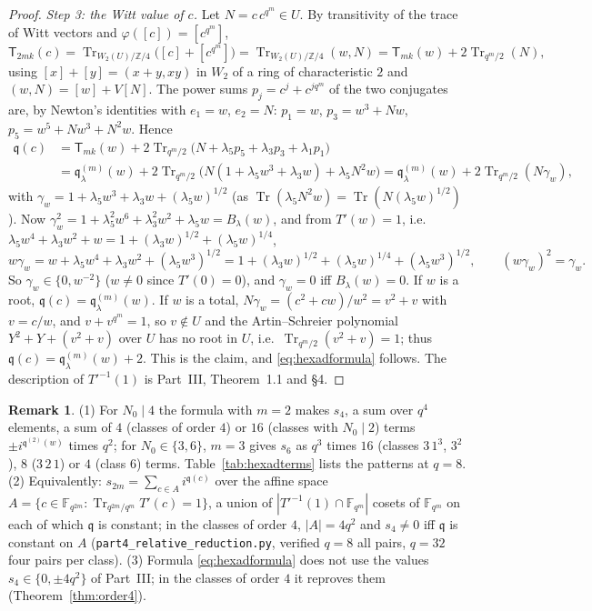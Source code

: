 \documentclass[12pt,a4paper]{amsart}
\theoremstyle{definition}
\newtheorem{remark}[theorem]{Remark}
\newcommand{\F}{\mathbb{F}}
\newcommand{\Z}{\mathbb{Z}}
\newcommand{\Tr}{\operatorname{Tr}}
\newcommand{\qq}{\mathfrak{q}}
\newcommand{\Tw}{\mathsf{T}}
\begin{document}
\begin{proof}
\emph{Step 3: the Witt value of $c$.} Let $N=c\,c^{q^m}\in U$. By transitivity of the trace of Witt vectors and $\varphi([c])=[c^{q^m}]$,
\[
\Tw_{2mk}(c)=\Tr_{W_2(U)/\Z/4}\bigl([c]+[c^{q^m}]\bigr)=\Tr_{W_2(U)/\Z/4}(w,N)=\Tw_{mk}(w)+2\Tr_{q^m/2}(N),
\]
using $[x]+[y]=(x+y,xy)$ in $W_2$ of a ring of characteristic $2$ and $(w,N)=[w]+V[N]$. The power sums $p_j=c^j+c^{jq^m}$ of the two conjugates are, by Newton's identities with $e_1=w$, $e_2=N$: $p_1=w$, $p_3=w^3+Nw$, $p_5=w^5+Nw^3+N^2w$. Hence
\begin{align*}
\qq(c)&=\Tw_{mk}(w)+2\Tr_{q^m/2}\bigl(N+\lambda_5p_5+\lambda_3p_3+\lambda_1p_1\bigr)\\
&=\qq^{(m)}_\lambda(w)+2\Tr_{q^m/2}\bigl(N(1+\lambda_5w^3+\lambda_3w)+\lambda_5N^2w\bigr)=\qq^{(m)}_\lambda(w)+2\Tr_{q^m/2}(N\gamma_w),
\end{align*}
with $\gamma_w=1+\lambda_5w^3+\lambda_3w+(\lambda_5w)^{1/2}$ (as $\Tr(\lambda_5N^2w)=\Tr(N(\lambda_5w)^{1/2})$). Now $\gamma_w^2=1+\lambda_5^2w^6+\lambda_3^2w^2+\lambda_5w=B_\lambda(w)$, and from $T'(w)=1$, i.e.\ $\lambda_5w^4+\lambda_3w^2+w=1+(\lambda_3w)^{1/2}+(\lambda_5w)^{1/4}$,
\[
w\gamma_w=w+\lambda_5w^4+\lambda_3w^2+(\lambda_5w^3)^{1/2}=1+(\lambda_3w)^{1/2}+(\lambda_5w)^{1/4}+(\lambda_5w^3)^{1/2},\qquad (w\gamma_w)^2=\gamma_w .
\]
So $\gamma_w\in\{0,w^{-2}\}$ ($w\ne0$ since $T'(0)=0$), and $\gamma_w=0$ iff $B_\lambda(w)=0$. If $w$ is a root, $\qq(c)=\qq^{(m)}_\lambda(w)$. If $w$ is a total, $N\gamma_w=(c^2+cw)/w^2=v^2+v$ with $v=c/w$, and $v+v^{q^m}=1$, so $v\notin U$ and the Artin--Schreier polynomial $Y^2+Y+(v^2+v)$ over $U$ has no root in $U$, i.e.\ $\Tr_{q^m/2}(v^2+v)=1$; thus $\qq(c)=\qq^{(m)}_\lambda(w)+2$. This is the claim, and \eqref{eq:hexadformula} follows. The description of $T'^{-1}(1)$ is Part~III, Theorem~1.1 and \S4.
\end{proof}

\begin{remark}
(1) For $N_0\mid4$ the formula with $m=2$ makes $s_4$, a sum over $q^4$ elements, a sum of $4$ (classes of order $4$) or $16$ (classes with $N_0\mid2$) terms $\pm i^{\qq^{(2)}(w)}$ times $q^2$; for $N_0\in\{3,6\}$, $m=3$ gives $s_6$ as $q^3$ times $16$ (classes $3\,1^3$, $3^2$), $8$ ($3\,2\,1$) or $4$ (class $6$) terms. Table~\ref{tab:hexadterms} lists the patterns at $q=8$. (2) Equivalently: $s_{2m}=\sum_{c\in A}i^{\qq(c)}$ over the affine space $A=\{c\in\F_{q^{2m}}:\Tr_{q^{2m}/q^m}T'(c)=1\}$, a union of $|T'^{-1}(1)\cap\F_{q^m}|$ cosets of $\F_{q^m}$ on each of which $\qq$ is constant; in the classes of order $4$, $|A|=4q^2$ and $s_4\ne0$ iff $\qq$ is constant on $A$ (\texttt{part4\_relative\_reduction.py}, verified $q=8$ all pairs, $q=32$ four pairs per class). (3) Formula \eqref{eq:hexadformula} does not use the values $s_4\in\{0,\pm4q^2\}$ of Part~III; in the classes of order $4$ it reproves them (Theorem~\ref{thm:order4}).
\end{remark}
\end{document}
